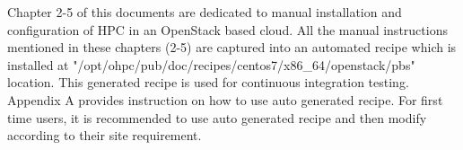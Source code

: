 
Chapter 2-5 of this documents are dedicated to manual installation and configuration of HPC in an OpenStack based cloud. All the manual instructions mentioned in these chapters (2-5) are captured into an automated recipe which is installed at "/opt/ohpc/pub/doc/recipes/centos7/x86\_64/openstack/pbs" location. This generated recipe is used for continuous integration testing. 
Appendix A provides instruction on how to use auto generated recipe. For first time users, it is recommended to use auto generated recipe and then modify according to their site requirement.

